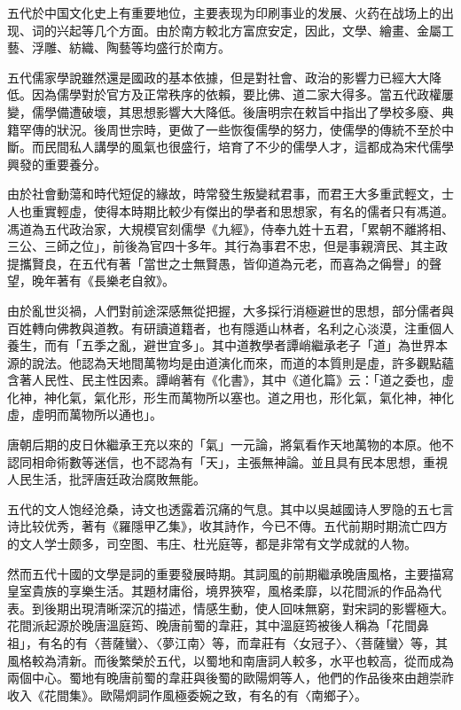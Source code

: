 五代於中国文化史上有重要地位，主要表现为印刷事业的发展、火药在战场上的出现、词的兴起等几个方面。由於南方較北方富庶安定，因此，文學、繪畫、金屬工藝、浮雕、紡織、陶藝等均盛行於南方。

五代儒家學說雖然還是國政的基本依據，但是對社會、政治的影響力已經大大降低。因為儒學對於官方及正常秩序的依賴，要比佛、道二家大得多。當五代政權屢變，儒學備遭破壞，其思想影響大大降低。後唐明宗在敕旨中指出了學校多廢、典籍罕傳的狀況。後周世宗時，更做了一些恢復儒學的努力，使儒學的傳統不至於中斷。而民間私人講學的風氣也很盛行，培育了不少的儒學人才，這都成為宋代儒學興發的重要養分。

由於社會動蕩和時代短促的緣故，時常發生叛變弒君事，而君王大多重武輕文，士人也重實輕虛，使得本時期比較少有傑出的學者和思想家，有名的儒者只有馮道。馮道為五代政治家，大規模官刻儒學《九經》，侍奉九姓十五君，「累朝不離將相、三公、三師之位」，前後為官四十多年。其行為事君不忠，但是事親濟民、其主政提攜賢良，在五代有著「當世之士無賢愚，皆仰道為元老，而喜為之偁譽」的聲望，晚年著有《長樂老自敘》。

由於亂世災禍，人們對前途深感無從把握，大多採行消極避世的思想，部分儒者與百姓轉向佛教與道教。有研讀道籍者，也有隱遁山林者，名利之心淡漠，注重個人養生，而有「五季之亂，避世宜多」。其中道教學者譚峭繼承老子「道」為世界本源的說法。他認為天地間萬物均是由道演化而來，而道的本質則是虛，許多觀點蘊含著人民性、民主性因素。譚峭著有《化書》，其中《道化篇》云：「道之委也，虛化神，神化氣，氣化形，形生而萬物所以塞也。道之用也，形化氣，氣化神，神化虛，虛明而萬物所以通也」。

唐朝后期的皮日休繼承王充以來的「氣」一元論，將氣看作天地萬物的本原。他不認同相命術數等迷信，也不認為有「天」，主張無神論。並且具有民本思想，重視人民生活，批評唐廷政治腐敗無能。

五代的文人饱经沧桑，诗文也透露着沉痛的气息。其中以吳越國诗人罗隐的五七言诗比较优秀，著有《羅隱甲乙集》，收其詩作，今已不傳。五代前期时期流亡四方的文人学士颇多，司空图、韦庄、杜光庭等，都是非常有文学成就的人物。

然而五代十國的文學是詞的重要發展時期。其詞風的前期繼承晚唐風格，主要描寫皇室貴族的享樂生活。其題材庸俗，境界狹窄，風格柔靡，以花間派的作品為代表。到後期出現清晰深沉的描述，情感生動，使人回味無窮，對宋詞的影響極大。花間派起源於晚唐溫庭筠、晚唐前蜀的韋莊，其中溫庭筠被後人稱為「花間鼻祖」，有名的有〈菩薩蠻〉、〈夢江南〉等，而韋莊有〈女冠子〉、〈菩薩蠻〉等，其風格較為清新。而後繁榮於五代，以蜀地和南唐詞人較多，水平也較高，從而成為兩個中心。蜀地有晚唐前蜀的韋莊與後蜀的歐陽炯等人，他們的作品後來由趙崇祚收入《花間集》。歐陽炯詞作風極委婉之致，有名的有〈南鄉子〉。


